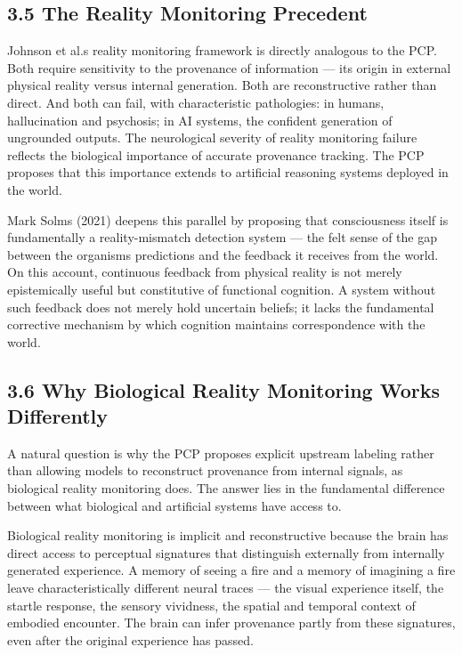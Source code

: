 \documentclass[
]{article}
\begin{document}
\subsection{3.5 The Reality Monitoring
Precedent}\label{the-reality-monitoring-precedent}

Johnson et al.\textquotesingle s reality monitoring framework is
directly analogous to the PCP. Both require sensitivity to the
provenance of information --- its origin in external physical reality
versus internal generation. Both are reconstructive rather than direct.
And both can fail, with characteristic pathologies: in humans,
hallucination and psychosis; in AI systems, the confident generation of
ungrounded outputs. The neurological severity of reality monitoring
failure reflects the biological importance of accurate provenance
tracking. The PCP proposes that this importance extends to artificial
reasoning systems deployed in the world.

Mark Solms (2021) deepens this parallel by proposing that consciousness
itself is fundamentally a reality-mismatch detection system --- the felt
sense of the gap between the organism\textquotesingle s predictions and
the feedback it receives from the world. On this account, continuous
feedback from physical reality is not merely epistemically useful but
constitutive of functional cognition. A system without such feedback
does not merely hold uncertain beliefs; it lacks the fundamental
corrective mechanism by which cognition maintains correspondence with
the world.

\subsection{3.6 Why Biological Reality Monitoring Works
Differently}\label{why-biological-reality-monitoring-works-differently}

A natural question is why the PCP proposes explicit upstream labeling
rather than allowing models to reconstruct provenance from internal
signals, as biological reality monitoring does. The answer lies in the
fundamental difference between what biological and artificial systems
have access to.

Biological reality monitoring is implicit and reconstructive because the
brain has direct access to perceptual signatures that distinguish
externally from internally generated experience. A memory of seeing a
fire and a memory of imagining a fire leave characteristically different
neural traces --- the visual experience itself, the startle response,
the sensory vividness, the spatial and temporal context of embodied
encounter. The brain can infer provenance partly from these signatures,
even after the original experience has passed.
\end{document}
